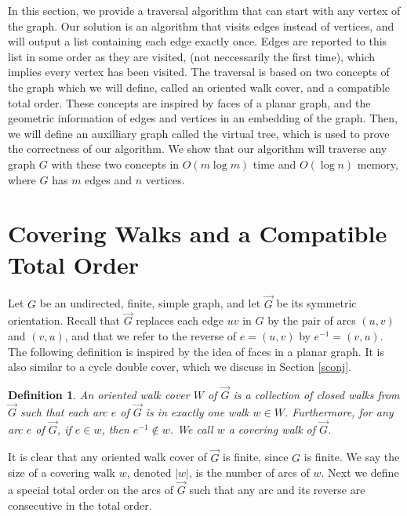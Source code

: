 \documentclass[12pt,letterpaper,oneside]{book}
\newtheorem{definition}[theorem]{Definition}
\begin{document}
In this section, we provide a traversal algorithm that can start with any vertex of the graph.  
Our solution is an algorithm that visits edges instead of vertices, and will output a list containing each edge exactly once.  Edges 
are reported to this list in some order as they are visited, (not neccessarily the first time), 
which implies every vertex has been visited.  
The traversal is based on two concepts of the graph 
which we will define, called an oriented walk cover, and a compatible total order.  
These concepts are inspired 
by faces of a planar graph, and the geometric information of edges and vertices in an embedding of the graph.  Then, we will define 
an auxilliary graph called the virtual tree, which is used to prove the correctness of our algorithm.  We show that 
our algorithm will traverse any graph $G$ with these two concepts in $O(m\log m)$ time and $O(\log n)$ memory, where $G$ has $m$ edges 
and $n$ vertices.  



\newpage
\section{Covering Walks and a Compatible Total Order}
\label{ss-prelim}

Let $G$ be an undirected, finite, simple graph, and let $\vec{G}$ be its symmetric orientation.  Recall that $\vec{G}$ replaces each  
edge $uv$ in $G$ by the pair of arcs $(u,v)$ and $(v,u)$, and that we refer to the 
reverse of $e= (u,v)$ by $e^{-1} = (v,u)$.  The following definition is inspired by the idea of faces in a planar graph.  It is also 
similar to a cycle double cover, which we discuss in Section \ref{sconj}.  


\begin{definition}
\label{def-ocw}
An oriented walk cover $W$ of $\vec{G}$ is a collection of closed walks from $\vec{G}$ such that 
each arc $e$ of $\vec{G}$ is in exactly one walk $w\in W$.  Furthermore, for any arc 
$e$ of $\vec{G}$, if $e\in w$, then $e^{-1} \notin w$.  We call $w$ a covering walk of $\vec{G}$.
\end{definition} 

It is clear that any oriented walk cover of $\vec{G}$ is finite, since $G$ is finite.  We say the size 
of a covering walk $w$, denoted $|w|$, is the number of arcs of $w$.  
Next we define a special total order on the arcs of $\vec{G}$ such that any arc and its reverse are consecutive in the total order.
\end{document}
